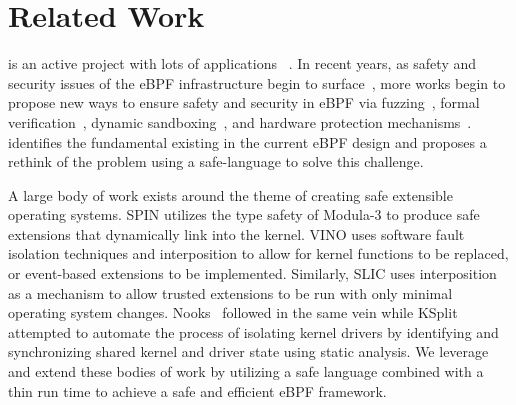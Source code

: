 \section{Related Work}

 is an active project with lots of applications
~\cite{BMC,Electrode,DINT,Hoiland-Jorgensen:conext:2018,Zhong:osdi:2022,jia2023,ebpf-kcfi}.
In recent years, as safety and security issues of the eBPF infrastructure begin
    to
    surface~\cite{EPF,CVE-2021-31440,CVE-2022-23222,CVE-2022-2785,
        CVE-2021-29154,CVE-2021-45402},
    more works begin to propose new ways to ensure safety and security in eBPF
    via fuzzing~\cite{hung2023brf}, formal
    verification~\cite{ebpf-jit-formal,proof-carrying-verifier},
    dynamic sandboxing~\cite{sandbpf}, and hardware protection
    mechanisms~\cite{lu2023moat,ebpf-pks}.
\projname{} identifies the fundamental \gap{} existing in the current eBPF design and
    proposes a rethink of the problem using a safe-language to solve this challenge.

A large body of work exists around the theme of creating safe extensible operating
    systems.
SPIN \cite{spin} utilizes the type safety of Modula-3 to produce
    safe extensions that dynamically link into the kernel.
VINO \cite{vino} uses software fault isolation techniques and interposition to
    allow for kernel functions to be replaced, or event-based extensions to be
    implemented.
Similarly, SLIC \cite{slic} uses interposition as a mechanism to allow trusted
    extensions to be run with only minimal operating system changes.
Nooks~\cite{nooks} followed in the same vein while KSplit~\cite{ksplit} attempted to
automate the process of isolating kernel drivers by identifying and synchronizing
shared kernel and driver state using static analysis. 
We leverage and extend these bodies of work by utilizing a safe language combined with
a thin run time to achieve a safe and efficient eBPF framework.

